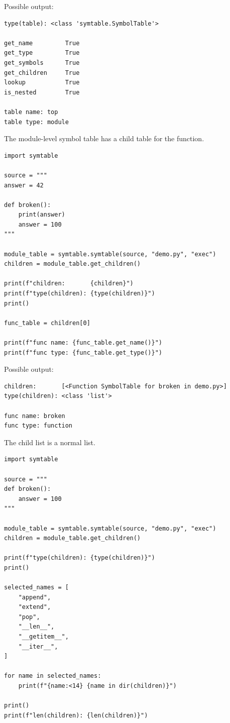 Possible output:

\begin{verbatim}
type(table): <class 'symtable.SymbolTable'>

get_name         True
get_type         True
get_symbols      True
get_children     True
lookup           True
is_nested        True

table name: top
table type: module
\end{verbatim}

The module-level symbol table has a child table for the function.

\begin{verbatim}
import symtable

source = """
answer = 42

def broken():
    print(answer)
    answer = 100
"""

module_table = symtable.symtable(source, "demo.py", "exec")
children = module_table.get_children()

print(f"children:       {children}")
print(f"type(children): {type(children)}")
print()

func_table = children[0]

print(f"func name: {func_table.get_name()}")
print(f"func type: {func_table.get_type()}")
\end{verbatim}

Possible output:

\begin{verbatim}
children:       [<Function SymbolTable for broken in demo.py>]
type(children): <class 'list'>

func name: broken
func type: function
\end{verbatim}

The child list is a normal list.

\begin{verbatim}
import symtable

source = """
def broken():
    answer = 100
"""

module_table = symtable.symtable(source, "demo.py", "exec")
children = module_table.get_children()

print(f"type(children): {type(children)}")
print()

selected_names = [
    "append",
    "extend",
    "pop",
    "__len__",
    "__getitem__",
    "__iter__",
]

for name in selected_names:
    print(f"{name:<14} {name in dir(children)}")

print()
print(f"len(children): {len(children)}")
\end{verbatim}

